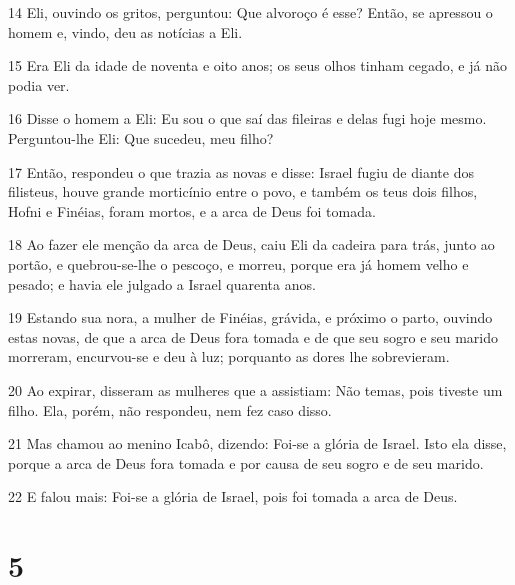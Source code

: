 \par 14 Eli, ouvindo os gritos, perguntou: Que alvoroço é esse? Então, se apressou o homem e, vindo, deu as notícias a Eli.
\par 15 Era Eli da idade de noventa e oito anos; os seus olhos tinham cegado, e já não podia ver.
\par 16 Disse o homem a Eli: Eu sou o que saí das fileiras e delas fugi hoje mesmo. Perguntou-lhe Eli: Que sucedeu, meu filho?
\par 17 Então, respondeu o que trazia as novas e disse: Israel fugiu de diante dos filisteus, houve grande morticínio entre o povo, e também os teus dois filhos, Hofni e Finéias, foram mortos, e a arca de Deus foi tomada.
\par 18 Ao fazer ele menção da arca de Deus, caiu Eli da cadeira para trás, junto ao portão, e quebrou-se-lhe o pescoço, e morreu, porque era já homem velho e pesado; e havia ele julgado a Israel quarenta anos.
\par 19 Estando sua nora, a mulher de Finéias, grávida, e próximo o parto, ouvindo estas novas, de que a arca de Deus fora tomada e de que seu sogro e seu marido morreram, encurvou-se e deu à luz; porquanto as dores lhe sobrevieram.
\par 20 Ao expirar, disseram as mulheres que a assistiam: Não temas, pois tiveste um filho. Ela, porém, não respondeu, nem fez caso disso.
\par 21 Mas chamou ao menino Icabô, dizendo: Foi-se a glória de Israel. Isto ela disse, porque a arca de Deus fora tomada e por causa de seu sogro e de seu marido.
\par 22 E falou mais: Foi-se a glória de Israel, pois foi tomada a arca de Deus.

\chapter{5}

